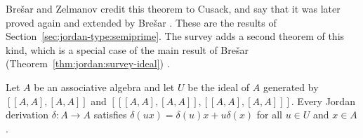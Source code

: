 Brešar and Zelmanov credit this theorem to Cusack, and say that it was later
proved again and extended by Brešar \cite[p.~225]{BresarZelmanov2025}. These
are the results of Section~\ref{sec:jordan-type:semiprime}. The survey adds a
second theorem of this kind, which is a special case of the main result of
Brešar (Theorem~\ref{thm:jordan:survey-ideal})
\cite[p.~225]{BresarZelmanov2025}.

\begin{theorem}\label{thm:jordan:survey-ideal}
Let $A$ be an associative algebra and let $U$ be the ideal of $A$ generated by
$[[A,A],[A,A]]$ and $[[[A,A],[A,A]],[[A,A],[A,A]]]$. Every Jordan derivation $\delta\colon A\to A$
satisfies $\delta(ux)=\delta(u)x+u\delta(x)$ for all $u\in U$ and $x\in A$.
\end{theorem}
